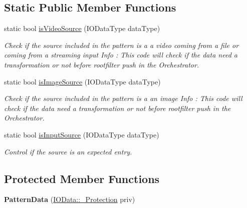 \subsection*{Static Public Member Functions}
\begin{DoxyCompactItemize}
\item 
static bool \hyperlink{classfilter_1_1data_1_1_pattern_data_ae677a413e5b1cf4bccdc4effc1598a7f}{is\+Video\+Source} (I\+O\+Data\+Type data\+Type)
\begin{DoxyCompactList}\small\item\em Check if the source included in the pattern is a a video coming from a file or coming from a streaming input Info \+: This code will check if the data need a transformation or not before rootfilter push in the Orchestrator. \end{DoxyCompactList}\item 
static bool \hyperlink{classfilter_1_1data_1_1_pattern_data_a5c6093f1ee788fc87a3835ffea7d46b4}{is\+Image\+Source} (I\+O\+Data\+Type data\+Type)
\begin{DoxyCompactList}\small\item\em Check if the source included in the pattern is a an image Info \+: This code will check if the data need a transformation or not before rootfilter push in the Orchestrator. \end{DoxyCompactList}\item 
static bool \hyperlink{classfilter_1_1data_1_1_pattern_data_a8be8618185495e9a86f73f4f506a80f7}{is\+Input\+Source} (I\+O\+Data\+Type data\+Type)
\begin{DoxyCompactList}\small\item\em Control if the source is an expected entry. \end{DoxyCompactList}\end{DoxyCompactItemize}
\subsection*{Protected Member Functions}
\begin{DoxyCompactItemize}
\item 
\mbox{\label{classfilter_1_1data_1_1_pattern_data_a0ec85768e2f28c7e2af75f870f146be1}} 
{\bfseries Pattern\+Data} (\hyperlink{classfilter_1_1data_1_1_i_o_data_1_1___protection}{I\+O\+Data\+::\+\_\+\+Protection} priv)
\end{DoxyCompactItemize}

